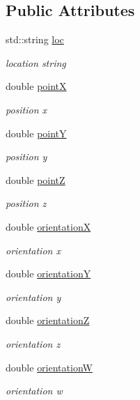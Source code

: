 \subsection*{Public Attributes}
\begin{DoxyCompactItemize}
\item 
std\-::string \hyperlink{structAction_1_1location_acc93573155b47f4a802f420c553a49e0}{loc}
\begin{DoxyCompactList}\small\item\em location string \end{DoxyCompactList}\item 
double \hyperlink{structAction_1_1location_aa8df7e1f54d12a455af659f1c6443e0c}{point\-X}
\begin{DoxyCompactList}\small\item\em position x \end{DoxyCompactList}\item 
double \hyperlink{structAction_1_1location_a0146e2b44bd7e2495234fa17cc6f1f6f}{point\-Y}
\begin{DoxyCompactList}\small\item\em position y \end{DoxyCompactList}\item 
double \hyperlink{structAction_1_1location_adafdc7ffa240979fd0a7a86ab43fb6fc}{point\-Z}
\begin{DoxyCompactList}\small\item\em position z \end{DoxyCompactList}\item 
double \hyperlink{structAction_1_1location_a0bf20c9eb2d9b7c8bda3271f643a2ba8}{orientation\-X}
\begin{DoxyCompactList}\small\item\em orientation x \end{DoxyCompactList}\item 
double \hyperlink{structAction_1_1location_aab40c1aea8f1b3614bd1cc379c24fef6}{orientation\-Y}
\begin{DoxyCompactList}\small\item\em orientation y \end{DoxyCompactList}\item 
double \hyperlink{structAction_1_1location_a9b6f1a2418c92521a96efa388f5b0c70}{orientation\-Z}
\begin{DoxyCompactList}\small\item\em orientation z \end{DoxyCompactList}\item 
double \hyperlink{structAction_1_1location_abccc48432b064e482f2a1f95f9799d30}{orientation\-W}
\begin{DoxyCompactList}\small\item\em orientation w \end{DoxyCompactList}\end{DoxyCompactItemize}


